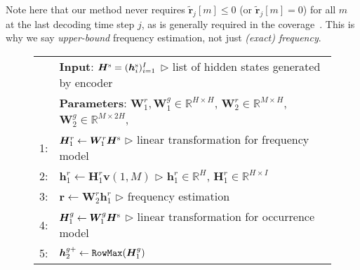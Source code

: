 \documentclass[11pt]{article}
\begin{document}
   Note here that our method never requires $\tilde{\bm{r}}_{j}[m] \!\leq\! 0$ (or $\tilde{\bm{r}}_{j}[m] \!=\! 0$) for all $m$ at the last decoding time step $j$, as is generally required in the coverage~\cite{tu-EtAl:2016:P16-1,mi-EtAl:2016:EMNLP2016,DBLP:journals/corr/WuSCLNMKCGMKSJL16}.
This is why we say {\it upper-bound} frequency estimation, not just {\it (exact) frequency}.



\begin{figure}[t]
 \centering
 \tabcolsep=1pt
 \small
 \begin{tabular}{rp{71mm}}
  \hline
  \ &\hspace{-1.2em}\textbf{Input}:
  $\bm{H}^{\rm s} = (\bm{h}^{\rm s}_i)^{I}_{i=1}$
  \hspace{\fill}
  $\triangleright$ {\scriptsize list of hidden states generated by encoder}
  \\
  \ &\hspace{-1.2em}\textbf{Parameters}:
      ${\bm W}^{r}_1, {\bm W}^{g}_1 \!\!\in\! \mathbb{R}^{H \times H}$,
      ${\bm W}^{r}_2 \!\!\in\! \mathbb{R}^{M \times H}$,
      ${\bm W}^{g}_2 \!\!\in\! \mathbb{R}^{M \times 2H}$,
      \\
1:&\hspace{0.0em}
      $\bm{H}^{r}_1 \leftarrow \bm{W}^{r}_1\bm{H}^{\rm s}$
      \hspace{\fill}
      $\triangleright$ {\scriptsize linear transformation for frequency model}
      \\
2:&\hspace{0.0em}
      $\bm{h}^{r}_1 \leftarrow \bm{H}^{r}_1\bm{v}(1,M)$
      \hspace{\fill}
      $\triangleright$ {\scriptsize $\bm{h}^{r}_1\in\mathbb{R}^{H}$, $\bm{H}^{r}_1\in\mathbb{R}^{H\times I}$}
      \\
3:&\hspace{0.0em}
      ${\bm{r}} \leftarrow \bm{W}^{r}_2 \bm{h}^{r}_1$
      \hspace{\fill}
      $\triangleright$ {\scriptsize frequency estimation}
      \\
4:&\hspace{0.0em}
      $\bm{H}^{g}_1 \leftarrow \bm{W}^{g}_1\bm{H}^{\rm s}$
      \hspace{\fill}
      $\triangleright$ {\scriptsize linear transformation for occurrence model}
      \\
5:&\hspace{0.0em}
      $\bm{h}^{g+}_2 \leftarrow \mbox{\tt RowMax}(\bm{H}^{g}_1)$

\end{tabular}
\end{figure}
\end{document}
